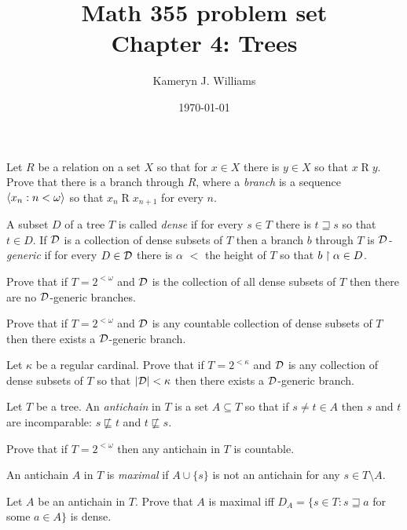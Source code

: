 \documentclass[10pt]{amsart}
\title{Math 355 problem set \\ Chapter 4: Trees}
\author{Kameryn J. Williams}
\date{\today}
\begin{document}
\maketitle

\begin{problem}
Let $R$ be a relation on a set $X$ so that for $x \in X$ there is $y \in X$ so that $x \mathbin R y$. Prove that there is a branch through $R$, where a \emph{branch} is a sequence ${\left\langle x_n : n < \omega \right\rangle}$ so that $x_n \mathbin R x_{n+1}$ for every $n$.
\end{problem}

A subset $D$ of a tree $T$ is called \emph{dense} if for every $s \in T$ there is $t \sqsupseteq s$ so that $t \in D$. If $\mathcal{D}$ is a collection of dense subsets of $T$ then a branch $b$ through $T$ is \emph{$\mathcal{D}$-generic} if for every $D \in \mathcal{D}$ there is $\alpha$ $<$ the height of $T$ so that $b \upharpoonright \alpha \in D$.

\begin{problem}
Prove that if $T = 2^{<\omega}$ and $\mathcal{D}$ is the collection of all dense subsets of $T$ then there are no $\mathcal{D}$-generic branches.
\end{problem}

\begin{problem}
Prove that if $T = 2^{<\omega}$ and $\mathcal{D}$ is any countable collection of dense subsets of $T$ then there exists a $\mathcal{D}$-generic branch.
\end{problem}

\begin{problem}
Let $\kappa$ be a regular cardinal.
Prove that if $T = 2^{<\kappa}$ and $\mathcal{D}$ is any collection of dense subsets of $T$ so that $\left\lvert \mathcal{D} \right\rvert < \kappa$ then there exists a $\mathcal{D}$-generic branch.
\end{problem}

Let $T$ be a tree. An \emph{antichain} in $T$ is a set $A \subseteq T$ so that if $s \ne t \in A$ then $s$ and $t$ are incomparable: $s \not \sqsubseteq t$ and $t \not \sqsubseteq s$. 

\begin{problem}
Prove that if $T = 2^{<\omega}$ then any antichain in $T$ is countable.
\end{problem}

An antichain $A$ in $T$ is \emph{maximal} if $A \cup \{s\}$ is not an antichain for any $s \in T \setminus A$.

\begin{problem}
Let $A$ be an antichain in $T$. Prove that $A$ is maximal iff $D_A = \{ s \in T : s \sqsupseteq a$ for some $a \in A\}$ is dense.
\end{problem}
\end{document}
